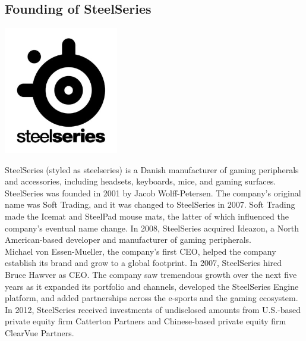 \documentclass[11pt]{report}
\begin{document}
\subsection{Founding of SteelSeries}
\vspace{2mm}\begin{center}\includegraphics[width=5cm]{./img/steelseriesLogo.jpg}\end{center}
SteelSeries (styled as steelseries) is a Danish manufacturer of gaming peripherals and accessories, including headsets, keyboards, mice, and gaming surfaces.\\
\indent SteelSeries was founded in 2001 by Jacob Wolff-Petersen. The company's original name was Soft Trading, and it was changed to SteelSeries in 2007. Soft Trading made the Icemat and SteelPad mouse mats, the latter of which influenced the company's eventual name change. In 2008, SteelSeries acquired Ideazon, a North American-based developer and manufacturer of gaming peripherals.\\
\indent Michael von Essen-Mueller, the company's first CEO, helped the company establish its brand and grow to a global footprint. In 2007, SteelSeries hired Bruce Hawver as CEO. The company saw tremendous growth over the next five years as it expanded its portfolio and channels, developed the SteelSeries Engine platform, and added partnerships across the e-sports and the gaming ecosystem.\\
\indent In 2012, SteelSeries received investments of undisclosed amounts from U.S.-based private equity firm Catterton Partners and Chinese-based private equity firm ClearVue Partners.
\end{document}
